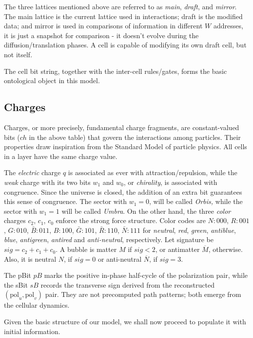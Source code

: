 \documentclass{ijuc}
\begin{document}
The three lattices mentioned above are referred to as \textit{main}, \textit{draft}, and \textit{mirror}. 
The main lattice is the current lattice used in interactions; draft is the modified data; and mirror is used in comparisons of information in different $W  $ addresses, it is just a snapshot for comparison - it doesn't evolve during the diffusion/translation phases. 
A cell is capable of modifying its own draft cell, but not itself.

The cell bit string, together with the inter-cell rules/gates, forms the basic ontological object in this model.

\subsection{Charges}
Charges, or more precisely, fundamental charge fragments, are constant-valued bits ($ch$ in the above table) that govern the interactions among particles. 
Their properties draw inspiration from the Standard Model of particle physics. 
All cells in a layer have the same charge value.

The \emph{electric} charge $q$ is associated as ever with attraction/repulsion, while the \emph{weak} charge with its two bits $w_{1}$ and $w_{0}$, or \emph{chirality}, is associated with congruence.
Since the universe is closed, the addition of an extra bit guarantees this sense of congruence. 
The sector with $w_{1}=0$, will be called \emph{Orbis, }while the sector with $w_{1}=1$ will be called \emph{Umbra}. 
On the other hand, the three \emph{color} charges $c_{2}$, $c_{1}$, $c_{0}$ enforce the strong force structure. 
Color codes are $N:000$, $R:001$, $G:010$, $\bar{B}:011$, $B:100$, $\bar{G}:101$, $\bar{R}:110$, $\bar{N}:111$ for \emph{neutral}, \emph{red}, \emph{green}, \emph{antiblue}, \emph{blue}, \emph{antigreen}, \emph{antired} and \emph{anti-neutral}, respectively.
Let signature be $sig=c_{2}+c_{1}+c_{0}$. 
A bubble is matter $M$ if $sig<2$, or antimatter $\overline{M}$, otherwise. 
Also, it is neutral $N$, if $sig=0$ or anti-neutral $\overline{N}$, if $sig=3$.

The pBit $pB$ marks the positive in-phase half-cycle of the polarization pair, while the sBit $sB$ records the transverse sign derived from the reconstructed $(\mathrm{pol}_u,\mathrm{pol}_v)$ pair.  They are not precomputed path patterns; both emerge from the cellular dynamics.

Given the basic structure of our model, we shall now proceed to populate it with initial information.
\end{document}
